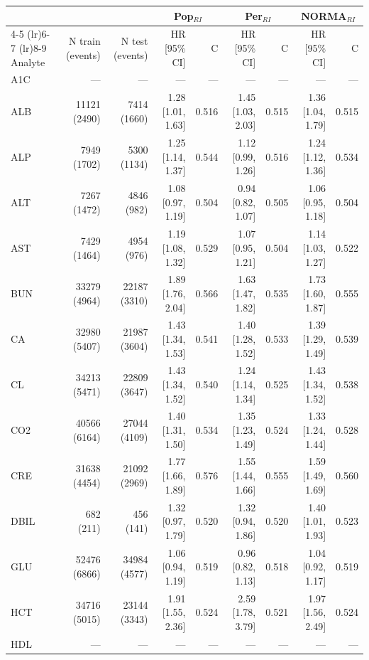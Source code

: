 \begin{table}[ht]
\centering
\footnotesize
\begin{tabular}{lrrrrrrrr}
\toprule
 & &  & \multicolumn{2}{c}{Pop$_{RI}$} & \multicolumn{2}{c}{Per$_{RI}$} & \multicolumn{2}{c}{NORMA$_{RI}$} \\
\cmidrule(lr){4-5} \cmidrule(lr){6-7} \cmidrule(lr){8-9}
Analyte & N train (events) & N test (events) & HR [95\% CI] & C & HR [95\% CI] & C & HR [95\% CI] & C \\
\midrule
A1C & --- & --- & --- & --- & --- & --- & --- & --- \\
ALB & 11121 (2490) & 7414 (1660) & 1.28 [1.01, 1.63] & 0.516 & 1.45 [1.03, 2.03] & 0.515 & 1.36 [1.04, 1.79] & 0.515 \\
ALP & 7949 (1702) & 5300 (1134) & 1.25 [1.14, 1.37] & 0.544 & 1.12 [0.99, 1.26] & 0.516 & 1.24 [1.12, 1.36] & 0.534 \\
ALT & 7267 (1472) & 4846 (982) & 1.08 [0.97, 1.19] & 0.504 & 0.94 [0.82, 1.07] & 0.505 & 1.06 [0.95, 1.18] & 0.504 \\
AST & 7429 (1464) & 4954 (976) & 1.19 [1.08, 1.32] & 0.529 & 1.07 [0.95, 1.21] & 0.504 & 1.14 [1.03, 1.27] & 0.522 \\
BUN & 33279 (4964) & 22187 (3310) & 1.89 [1.76, 2.04] & 0.566 & 1.63 [1.47, 1.82] & 0.535 & 1.73 [1.60, 1.87] & 0.555 \\
CA & 32980 (5407) & 21987 (3604) & 1.43 [1.34, 1.53] & 0.541 & 1.40 [1.28, 1.52] & 0.533 & 1.39 [1.29, 1.49] & 0.539 \\
CL & 34213 (5471) & 22809 (3647) & 1.43 [1.34, 1.52] & 0.540 & 1.24 [1.14, 1.34] & 0.525 & 1.43 [1.34, 1.52] & 0.538 \\
CO2 & 40566 (6164) & 27044 (4109) & 1.40 [1.31, 1.50] & 0.534 & 1.35 [1.23, 1.49] & 0.524 & 1.33 [1.24, 1.44] & 0.528 \\
CRE & 31638 (4454) & 21092 (2969) & 1.77 [1.66, 1.89] & 0.576 & 1.55 [1.44, 1.66] & 0.555 & 1.59 [1.49, 1.69] & 0.560 \\
DBIL & 682 (211) & 456 (141) & 1.32 [0.97, 1.79] & 0.520 & 1.32 [0.94, 1.86] & 0.520 & 1.40 [1.01, 1.93] & 0.523 \\
GLU & 52476 (6866) & 34984 (4577) & 1.06 [0.94, 1.19] & 0.519 & 0.96 [0.82, 1.13] & 0.518 & 1.04 [0.92, 1.17] & 0.519 \\
HCT & 34716 (5015) & 23144 (3343) & 1.91 [1.55, 2.36] & 0.524 & 2.59 [1.78, 3.79] & 0.521 & 1.97 [1.56, 2.49] & 0.524 \\
HDL & --- & --- & --- & --- & --- & --- & --- & --- \\

\end{tabular}
\end{table}
